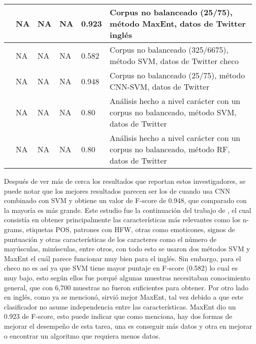 \begin{table}[!ht]
\begin{tabular}{|l|l|l|l|l|>{\raggedleft\arraybackslash}p{4cm}|}
		\textcite{ptavcek2014sarcasm}   & NA    & NA    & NA     & 0.923 & Corpus no balanceado (25/75), método  MaxEnt, datos de Twitter inglés                     \\ \hline
		\textcite{ptavcek2014sarcasm}   & NA    & NA    & NA     & 0.582 & Corpus no balanceado (325/6675), método  SVM, datos de Twitter checo                      \\ \hline
		\textcite{poria2016deeper}      & NA    & NA    & NA     & 0.948 & Corpus no balanceado (25/75), método  CNN-SVM, datos de Twitter                           \\ \hline
		\textcite{lopez2016character}   & NA    & NA    & NA     & 0.80  & Análisis hecho a nivel carácter con un corpus no balanceado, método SVM, datos de Twitter \\ \hline       \textcite{lopez2016character}      & NA        & NA     & NA        & 0.80     & Análisis hecho a nivel carácter con un corpus no balanceado, método RF, datos de Twitter                                                                                       \\ \hline
	\end{tabular}
	
	\label{tab:resultados}
\end{table}


\par Después de ver más de cerca los resultados que reportan estos investigadores, se puede notar que los mejores resultados parecen ser los de \textcite{poria2016deeper} cuando usa CNN combinado con SVM y obtiene un valor de  \gls{F-score} de 0.948, que comparado con la mayoría es más grande. Este estudio fue la continuación del trabajo de \textcite{ptavcek2014sarcasm}, el cual consistía en obtener principalmente las características más relevantes como los \gls{n-grams}, etiquetas \gls{POS}, patrones con \gls{HFW}, otras como emoticones, signos de puntuación y otras características de los caracteres como el número de mayúsculas, minúsculas, entre otros, con todo esto se usaron dos métodos \gls{SVM} y \gls{MaxEnt} el cuál parece funcionar muy bien para el inglés. Sin embargo, para el checo no es así ya que SVM tiene mayor puntaje en F-score (0.582) lo cual es muy bajo, esto según ellos fue porqué algunas muestras necesitaban conocimiento general, que con 6,700 muestras no fueron suficientes para obtener. Por otro lado en inglés, como ya se mencionó, sirvió mejor \gls{MaxEnt}, tal vez debido a que este clasificador no asume independencia entre las características. \gls{MaxEnt} dio un 0.923 de F-score, esto puede indicar que como \textcite{domingos2012few} menciona, hay dos formas de mejorar el desempeño de esta tarea, una es conseguir más datos y otra en mejorar o encontrar un algoritmo que requiera menos datos.


